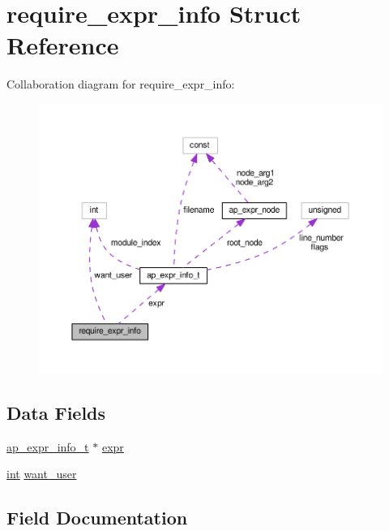 \hypertarget{structrequire__expr__info}{}\section{require\+\_\+expr\+\_\+info Struct Reference}
\label{structrequire__expr__info}


Collaboration diagram for require\+\_\+expr\+\_\+info\+:
\nopagebreak
\begin{figure}[H]
\begin{center}
\leavevmode
\includegraphics[width=350pt]{structrequire__expr__info__coll__graph}
\end{center}
\end{figure}
\subsection*{Data Fields}
\begin{DoxyCompactItemize}
\item 
\hyperlink{structap__expr__info__t}{ap\+\_\+expr\+\_\+info\+\_\+t} $\ast$ \hyperlink{structrequire__expr__info_a7ecf28fea663047a43315344fdf0df80}{expr}
\item 
\hyperlink{pcre_8txt_a42dfa4ff673c82d8efe7144098fbc198}{int} \hyperlink{structrequire__expr__info_a5f5166ca9d65d558c9ae9adaf84a7697}{want\+\_\+user}
\end{DoxyCompactItemize}


\subsection{Field Documentation}
